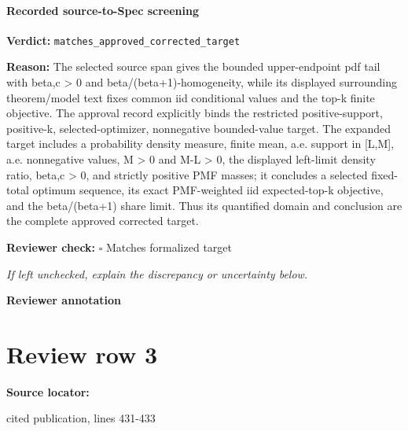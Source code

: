\documentclass[10pt]{article}
\newcommand{\reviewerbox}{%
  \par\noindent\fbox{\parbox{0.96\linewidth}{\rule{0pt}{0.38in}}}\par
}
\newcommand{\reviewmatch}[1]{%
  \par\noindent\textbf{Reviewer check:} $\square$\; #1\par
  \noindent\emph{If left unchecked, explain the discrepancy or uncertainty below.}\par
}
\begin{document}
\paragraph{Recorded source-to-Spec screening}
\textbf{Verdict:} \texttt{matches\_approved\_corrected\_target}
\\
{\raggedright
\textbf{Reason:} The selected source span gives the bounded upper-\allowbreak{}endpoint pdf tail with beta,c > 0 and beta/\allowbreak{}(beta+1)-\allowbreak{}homogeneity, while its displayed surrounding theorem/\allowbreak{}model text fixes common iid conditional values and the top-\allowbreak{}k finite objective.\allowbreak{} The approval record explicitly binds the restricted positive-\allowbreak{}support, positive-\allowbreak{}k, selected-\allowbreak{}optimizer, nonnegative bounded-\allowbreak{}value target.\allowbreak{} The expanded target includes a probability density measure, finite mean, a.\allowbreak{}e.\allowbreak{} support in [L,M], a.\allowbreak{}e.\allowbreak{} nonnegative values, M > 0 and M-\allowbreak{}L > 0, the displayed left-\allowbreak{}limit density ratio, beta,c > 0, and strictly positive PMF masses;\allowbreak{} it concludes a selected fixed-\allowbreak{}total optimum sequence, its exact PMF-\allowbreak{}weighted iid expected-\allowbreak{}top-\allowbreak{}k objective, and the beta/\allowbreak{}(beta+1) share limit.\allowbreak{} Thus its quantified domain and conclusion are the complete approved corrected target.\allowbreak{}
\par}
\reviewmatch{Matches formalized target}
\noindent\textbf{Reviewer annotation}\par
\reviewerbox
\clearpage
\hypertarget{source-claim-378eee8a78b6ada4}{}
\section*{Review row 3}
\textbf{Source locator:} {\footnotesize\raggedright cited publication, lines 431-\allowbreak{}433\par}
\end{document}
